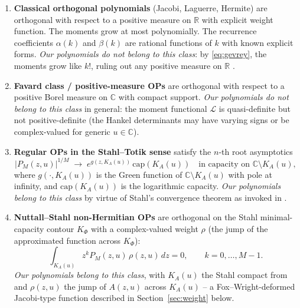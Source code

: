 \documentclass{article}
\newcommand{\C}{\mathbb{C}}
\newcommand{\R}{\mathbb{R}}
\begin{document}
\begin{enumerate}
\item \textbf{Classical orthogonal polynomials} (Jacobi, Laguerre,
  Hermite) are orthogonal with respect to a positive measure on $\R$
  with explicit weight function. The moments grow at most polynomially.
  The recurrence coefficients $\alpha(k)$ and $\beta(k)$ are rational
  functions of $k$ with known explicit forms.
  \emph{Our polynomials do not belong to this class}: by \eqref{eq:gevrey},
  the moments grow like $k!$, ruling out any positive measure on $\R$
  \cite{StahlTotik1992}.

\item \textbf{Favard class / positive-measure OPs} are orthogonal with
  respect to a positive Borel measure on $\C$ with compact support.
  \emph{Our polynomials do not belong to this class} in general: the
  moment functional $\mathcal{L}$ is quasi-definite but not positive-definite
  (the Hankel determinants may have varying signs or be complex-valued for
  generic $u \in \C$).

\item \textbf{Regular OPs in the Stahl--Totik sense} \cite{StahlTotik1992}
  satisfy the $n$-th root asymptotics
  \begin{equation}\label{eq:nth_root}
    |P_M(z,u)|^{1/M} \;\to\; e^{g(z,K_A(u))}\,\mathrm{cap}(K_A(u))
    \quad \text{in capacity on } \C \setminus K_A(u),
  \end{equation}
  where $g(\cdot, K_A(u))$ is the Green function of $\C \setminus K_A(u)$
  with pole at infinity, and $\mathrm{cap}(K_A(u))$ is the logarithmic
  capacity. \emph{Our polynomials belong to this class} by virtue of
  Stahl's convergence theorem \cite{Stahl1997} as invoked in
  \cite{Crowley2026}.

\item \textbf{Nuttall--Stahl non-Hermitian OPs} \cite{NuttallSingh1977,
  Stahl1985I,Stahl1985II,GoncharRakhmanov1987} are orthogonal on the
  Stahl minimal-capacity contour $K_\Phi$ with a complex-valued weight
  $\rho$ (the jump of the approximated function across $K_\Phi$):
  \begin{equation}\label{eq:nh_orth}
    \int_{K_A(u)} z^k P_M(z,u)\,\rho(z,u)\,dz = 0,
    \qquad k = 0, \dots, M-1.
  \end{equation}
  \emph{Our polynomials belong to this class}, with $K_A(u)$ the Stahl
  compact from \cite{Crowley2026} and $\rho(z,u)$ the jump of $A(z,u)$
  across $K_A(u)$ -- a Fox--Wright-deformed Jacobi-type function described
  in Section~\ref{sec:weight} below.
\end{enumerate}
\end{document}
